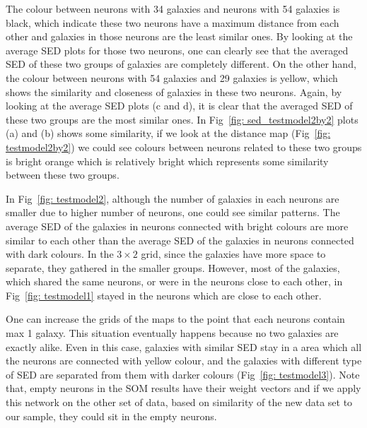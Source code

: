     The colour between neurons with 34 galaxies and neurons with 54 galaxies is black, which indicate these two neurons have a maximum distance from each other and galaxies in those neurons are the least similar ones. By looking at the average SED plots for those two neurons, one can clearly see that the averaged SED of these two groups of galaxies are completely different. %
    On the other hand, the colour between neurons with 54 galaxies and 29 galaxies is yellow, which shows the similarity and closeness of galaxies in these two neurons. 
    Again, by looking at the average SED plots (c and d), it is clear that the averaged SED of these two groups are the most similar ones. 
    In Fig~\ref{fig: sed_testmodel2by2} plots (a) and (b) shows some similarity, if we look at the distance map (Fig~\ref{fig: testmodel2by2}) we could see colours between neurons related to these two groups is bright orange which is relatively bright which represents some similarity between these two groups.
    
    In Fig~\ref{fig: testmodel2}, although the number of galaxies in each neurons are smaller due to higher number of neurons, one could see similar patterns. 
    The average SED of the galaxies in neurons connected with bright colours are more similar to each other than the average SED of the galaxies in neurons connected with dark colours.
    In the $3\times2$ grid, since the galaxies have more space to separate, they gathered in the smaller groups. 
    However, most of the galaxies, which shared the same neurons, or were in the neurons close to each other, in Fig~\ref{fig: testmodel1} stayed in the neurons which are close to each other.
    
    One can increase the grids of the maps to the point that each neurons contain max 1 galaxy. 
    This situation eventually happens because no two galaxies are exactly alike.
    Even in this case, galaxies with similar SED stay in a area which all the neurons are connected with yellow colour, and the galaxies with different type of SED are separated from them with darker colours (Fig~\ref{fig: testmodel3}). 
    Note that, empty neurons in the SOM results have their weight vectors and if we apply this network on the other set of data, based on similarity of the new data set to our sample, they could sit in the empty neurons.
    
